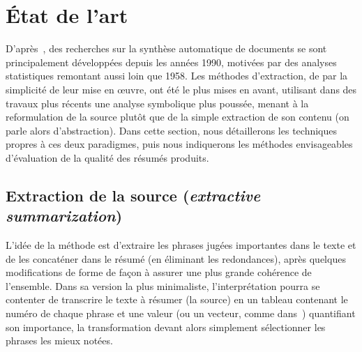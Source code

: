 \documentclass{article}           %
\begin{document}


\section{État de l'art} %
D'après~\cite{jones_automatic_2007}, des recherches sur la synthèse automatique de documents se sont principalement développées depuis les années 1990, motivées par des analyses statistiques remontant aussi loin que 1958. Les méthodes d'extraction, de par la simplicité de leur mise en œuvre, ont été le plus mises en avant, utilisant dans des travaux plus récents une analyse symbolique plus poussée, menant à la reformulation de la source plut\^{o}t que de la simple extraction de son contenu (on parle alors d'abstraction). Dans cette section, nous détaillerons les techniques propres à ces deux paradigmes, puis nous indiquerons les méthodes envisageables d'évaluation de la qualité des résumés produits.

\subsection{Extraction de la source (\emph{extractive summarization})}

L'idée de la méthode est d'extraire les phrases jugées importantes dans le texte et de les concaténer dans le résumé (en éliminant les redondances), après quelques modifications de forme de façon à assurer une plus grande cohérence de l'ensemble. Dans sa version la plus minimaliste, l'interprétation pourra se contenter de transcrire le texte à résumer (la source) en un tableau contenant le numéro de chaque phrase et une valeur (ou un vecteur, comme dans~\cite{fattah_ga_2009}) quantifiant son importance, la transformation devant alors simplement sélectionner les phrases les mieux notées. 
\end{document}
